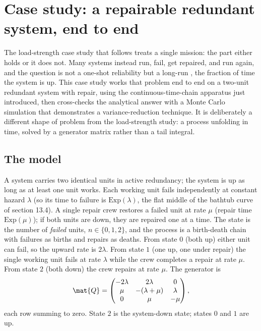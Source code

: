 \section{Case study: a repairable redundant system, end to end}
\label{sec:vol02:ch13:availability}

The load-strength case study that follows treats a single mission: the
part either holds or it does not. Many systems instead run, fail, get
repaired, and run again, and the question is not a one-shot reliability
but a long-run , the fraction of time the system
is up. This case study works that problem end to end on a two-unit
redundant system with repair, using the continuous-time-chain apparatus
just introduced, then cross-checks the analytical answer with a Monte
Carlo simulation that demonstrates a variance-reduction technique. It is
deliberately a different shape of problem from the load-strength study:
a process unfolding in time, solved by a generator matrix rather than a
tail integral.

\subsection{The model}

A system carries two identical units in active redundancy; the system is
up as long as at least one unit works. Each working unit fails
independently at constant hazard $\lambda$ (so its time to failure is
$\mathrm{Exp}(\lambda)$, the flat middle of the bathtub curve of section
13.4). A single repair crew restores a failed unit at rate $\mu$ (repair
time $\mathrm{Exp}(\mu)$); if both units are down, they are repaired one
at a time. The state is the number of \emph{failed} units, $n \in
\{0, 1, 2\}$, and the process is a birth-death chain with failures as
births and repairs as deaths. From state $0$ (both up) either unit can
fail, so the upward rate is $2\lambda$. From state $1$ (one up, one
under repair) the single working unit fails at rate $\lambda$ while the
crew completes a repair at rate $\mu$. From state $2$ (both down) the
crew repairs at rate $\mu$. The generator is
\[
\mat{Q} = \begin{pmatrix}
-2\lambda & 2\lambda & 0 \\
\mu & -(\lambda + \mu) & \lambda \\
0 & \mu & -\mu
\end{pmatrix},
\]
each row summing to zero. State $2$ is the system-down state; states $0$
and $1$ are up.

